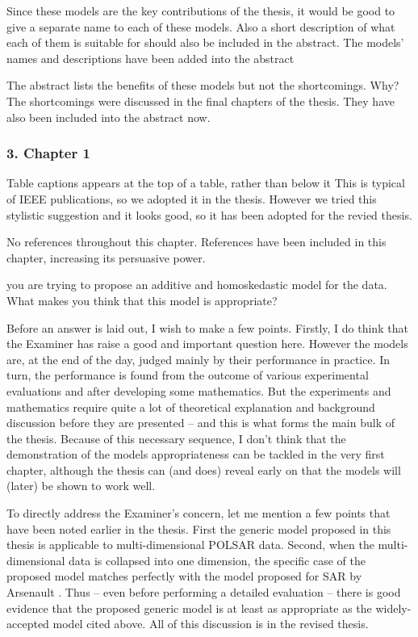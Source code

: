 \replyToComment
    {
      Since these models are the key contributions of the thesis, it would be good to give a separate name to each of these models.
      Also a short description of what each of them is suitable for should also be included in the abstract.
    }
    {The models' names and descriptions have been added into the abstract}

\replyToComment
    {The abstract lists the benefits of these models but not the shortcomings. Why?}
    {
      The shortcomings were discussed in the final chapters of the thesis.
      They have also been included into the abstract now.
    }

\subsubsection*{3. Chapter 1}

\replyToComment
    {Table captions appears at the top of a table, rather than below it}
    {This is typical of IEEE publications, so we adopted it in the thesis. However we tried this stylistic suggestion and it looks good, so it has been adopted for the revied thesis.}

\replyToComment
    {No references throughout this chapter.}
    {References have been included in this chapter, increasing its persuasive power.}

\replyToComment
    {you are trying to propose an additive and homoskedastic model for the data. What makes you think that this model is appropriate?}
    {Before an answer is laid out, I wish to make a few points.
Firstly, I do think that the Examiner has raise a good and important question here.
However %
the models are, at the end of the day, judged mainly by their performance in practice. In turn, the performance is found from the outcome of various experimental evaluations and after developing some mathematics. But the experiments and mathematics require quite a lot of theoretical explanation and background discussion before they are presented -- and this is what forms the main bulk of the thesis. 
Because of this necessary sequence, I don't think that the demonstration of the models appropriateness can be tackled in the very first chapter, although the thesis can (and does) reveal early on that the models will (later) be shown to work well.

To directly address the Examiner's concern, let me mention a few points that have been noted earlier in the thesis.
First the generic model proposed in this thesis is applicable to multi-dimensional POLSAR data.
Second, when the multi-dimensional data is collapsed into one dimension, 
  the specific case of the proposed model matches perfectly with the model proposed for SAR by Arsenault \cite{Arsenault_JOptSocAm_1976}. 
Thus -- even before performing a detailed evaluation -- there is good evidence that the proposed generic model is at least as appropriate as the widely-accepted model cited above.
All of this discussion is in the revised thesis.
}

